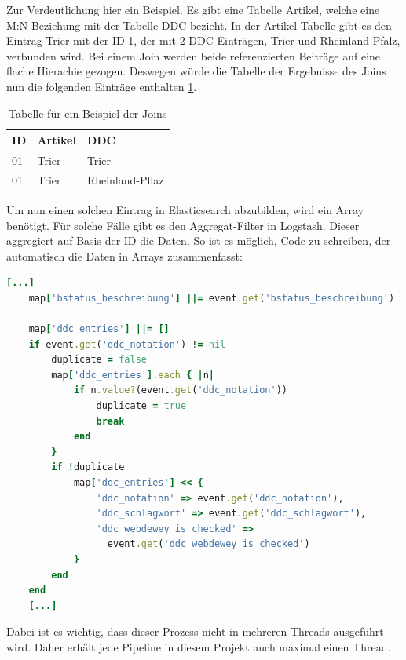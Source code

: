 Zur Verdeutlichung hier ein Beispiel.
Es gibt eine Tabelle Artikel, welche eine M:N-Beziehung mit der Tabelle DDC bezieht. In der Artikel Tabelle gibt es den Eintrag Trier mit der ID 1, der mit 2 DDC Einträgen, Trier und Rheinland-Pfalz, verbunden wird. Bei einem Join werden beide referenzierten Beiträge auf eine flache Hierachie gezogen. Deswegen würde die Tabelle der Ergebnisse des Joins nun die folgenden Einträge enthalten \ref{tbl:join}.

\begin{table} %
	\centering
		\begin{tabular}{l | l | l}
		    \textbf{ID} & \textbf{Artikel} & \textbf{DDC} \\
        \hline
        01 & Trier & Trier \\
        01 & Trier & Rheinland-Pflaz  \\
		\end{tabular}
    \caption{Tabelle für ein Beispiel der Joins}
    \label{tbl:join}
\end{table}

Um nun einen solchen Eintrag in Elasticsearch abzubilden, wird ein Array benötigt. Für solche Fälle gibt es den Aggregat-Filter in Logstash. Dieser aggregiert auf Basis der ID die Daten. So ist es möglich, Code zu schreiben, der automatisch die Daten in Arrays zusammenfasst:

\begin{lstlisting}[language=Ruby, frame=single, label={lst:fronendConf}, caption=Auschnitt aus dem Aggregat-Filter von Logstash,captionpos=b] 
    [...]
    map['bstatus_beschreibung'] ||= event.get('bstatus_beschreibung')
    
    map['ddc_entries'] ||= []
    if event.get('ddc_notation') != nil
        duplicate = false
        map['ddc_entries'].each { |n|
            if n.value?(event.get('ddc_notation'))
                duplicate = true
                break
            end
        }
        if !duplicate
            map['ddc_entries'] << {
                'ddc_notation' => event.get('ddc_notation'),
                'ddc_schlagwort' => event.get('ddc_schlagwort'),
                'ddc_webdewey_is_checked' => 
                  event.get('ddc_webdewey_is_checked')
            }
        end
    end
    [...]
    \end{lstlisting}

Dabei ist es wichtig, dass dieser Prozess nicht in mehreren Threads ausgeführt wird. Daher erhält jede Pipeline in diesem Projekt auch maximal einen Thread.

